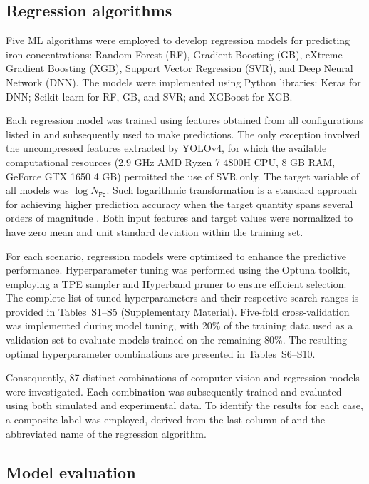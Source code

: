 \documentclass[10pt]{iopart}
\begin{document}
\subsection{Regression algorithms}\label{subsec:RegAlg}

Five ML algorithms were employed to develop regression models for predicting iron concentrations:
Random Forest (RF), Gradient Boosting (GB), eXtreme Gradient Boosting (XGB), Support Vector Regression (SVR), and Deep Neural Network (DNN).
The models were implemented using Python libraries: Keras for DNN; Scikit-learn for RF, GB, and SVR; and XGBoost for XGB.

Each regression model was trained using features obtained from all configurations listed in  and subsequently used to make predictions.
The only exception involved the uncompressed features extracted by YOLOv4, for which the available computational resources
(2.9 GHz AMD Ryzen 7 4800H CPU, 8 GB RAM, GeForce GTX 1650 4 GB) permitted the use of SVR only.
The target variable of all models was $\log N_\mathtt{Fe}$.
Such logarithmic transformation is a standard approach for achieving higher prediction accuracy
when the target quantity spans several orders of magnitude \cite{Srivastava2023, Minagawa2024}.
Both input features and target values were normalized to have zero mean and unit standard deviation within the training set.

For each scenario, regression models were optimized to enhance the predictive performance.
Hyperparameter tuning was performed using the Optuna toolkit,
employing a TPE sampler and Hyperband pruner to ensure efficient selection.
The complete list of tuned hyperparameters and their respective search ranges is provided in Tables~S1–S5 (Supplementary Material).
Five-fold cross-validation was implemented during model tuning, with 20\% of the training data used as a validation set
to evaluate models trained on the remaining 80\%.
The resulting optimal hyperparameter combinations are presented in Tables~S6–S10.

Consequently, 87 distinct combinations of computer vision and regression models were investigated.
Each combination was subsequently trained and evaluated using both simulated and experimental data.
To identify the results for each case, a composite label was employed, derived from the last column of 
and the abbreviated name of the regression algorithm.


\subsection{Model evaluation}\label{subsec:ModEva}
\end{document}
